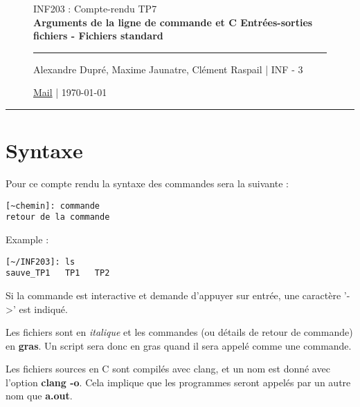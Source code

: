 \documentclass[12pt,a4paper,notitlepage,colorinlistoftodos]{article}
\begin{document}
\begin{figure}
    \begin{minipage}{.75\textwidth}
    \begin{center}
    {\Large INF203 : Compte-rendu TP7 \\ \textbf{Arguments de la ligne de commande et C
Entrées-sorties fichiers - Fichiers standard}}
    \end{center}
    \rule{7em}{.4pt}\par
     Alexandre Dupré, Maxime Jaunatre, Clément Raspail | INF - 3 \par 
     \href{mailto:alexandre.dupre@etu.univ-grenoble-alpes.fr,maxime.jaunatre@etu.univ-grenoble-alpes.fr, clement.raspail@etu.univ-grenoble-alpes.fr}{Mail} | \today
\end{minipage}
\end{figure}

\hrule

\section*{Syntaxe}

\iffalse
 Alexandre Dupré <alexandre.dupre@etu.univ-grenoble-alpes.fr>
 Maxime Jaunatre <maxime.jaunatre@etu.univ-grenoble-alpes.fr> 
 Clément Raspail <clement.raspail@etu.univ-grenoble-alpes.fr>
\fi

Pour ce compte rendu la syntaxe des commandes sera la suivante :
\begin{lstlisting}
[~chemin]: commande
retour de la commande
\end{lstlisting}

Example :
\begin{lstlisting}
[~/INF203]: ls
sauve_TP1   TP1   TP2
\end{lstlisting}

Si la commande est interactive et demande d'appuyer  sur entrée, une caractère '->' est indiqué.

Les fichiers sont en \textit{italique} et les commandes (ou détails de retour de commande) en \textbf{gras}. Un script sera donc en gras quand il sera appelé comme une commande.


Les fichiers sources en C sont compilés avec clang, et un nom est donné avec l'option \textbf{clang -o}. Cela implique que les programmes seront appelés par un autre nom que \textbf{a.out}.
\end{document}

